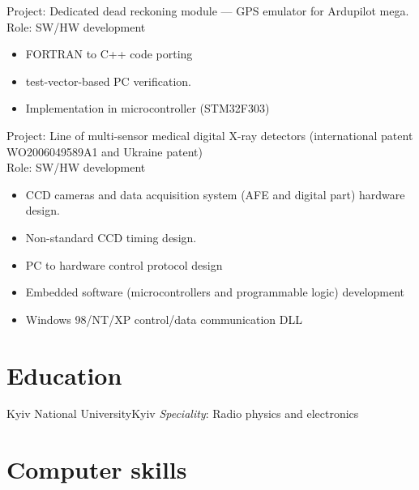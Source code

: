 \documentclass[11pt,a4paper]{moderncv}
\begin{document}
  {Project: Dedicated dead reckoning module — GPS emulator for Ardupilot mega.\\
    Role: SW/HW development
    \begin{itemize}
      \item FORTRAN to C++ code porting
      \item test-vector-based PC verification.
      \item Implementation in microcontroller (STM32F303)
    \end{itemize}}
  {Project: Line of multi-sensor medical digital X-ray detectors (international patent
WO2006049589A1 and Ukraine patent)\\
    Role: SW/HW development
    \begin{itemize}
      \item CCD cameras and data acquisition system (AFE and digital part) hardware design.
      \item Non-standard CCD timing design.
      \item PC to hardware control protocol design
      \item Embedded software (microcontrollers and programmable logic) development
      \item Windows 98/NT/XP control/data communication DLL
    \end{itemize}}


\section{Education}
  {Kyiv National University}{Kyiv}{}
  {\textit{Speciality}: Radio physics and electronics}

\section{Computer skills}
\end{document}
